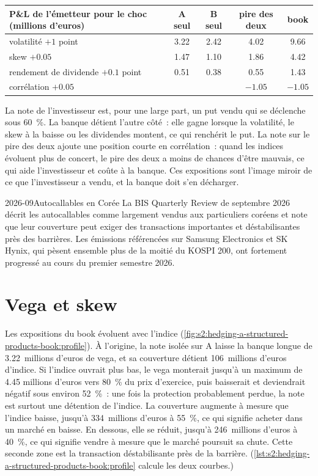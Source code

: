 \begin{center}
\small
\begin{tabular}{@{}lcccc@{}}
\toprule
P\&L de l'émetteur pour le choc (millions d'euros) & A seul & B seul & pire des deux & book\\
\midrule
volatilité $+1$ point & 3.22 & 2.42 & 4.02 & 9.66\\
skew $+0.05$ & 1.47 & 1.10 & 1.86 & 4.42\\
rendement de dividende $+0.1$ point & 0.51 & 0.38 & 0.55 & 1.43\\
corrélation $+0.05$ & & & $-1.05$ & $-1.05$\\
\bottomrule
\end{tabular}
\end{center}

La note de l'investisseur est, pour une large part, un put vendu qui se déclenche sous 60~\%. La banque détient l'autre côté~: elle gagne lorsque la volatilité, le skew à la baisse ou
les dividendes montent, ce qui renchérit le put. La note sur le pire des deux ajoute une position courte en corrélation~: quand les indices évoluent plus de concert, le pire
des deux a moins de chances d'être mauvais, ce qui aide l'investisseur et coûte à la banque. Ces expositions sont l'image miroir de ce que l'investisseur a vendu, et la
banque doit s'en décharger.

\begin{dated}{2026-09}{Autocallables en Corée}\label{dat:s2:hedging-a-structured-products-book:korea}
La BIS Quarterly Review de septembre 2026 décrit les autocallables comme largement vendus aux particuliers coréens et note que leur couverture peut exiger
des transactions importantes et déstabilisantes près des barrières. Les émissions référencées sur Samsung Electronics et SK Hynix, qui pèsent ensemble plus de la moitié du KOSPI 200, ont
fortement progressé au cours du premier semestre 2026.
\end{dated}

\section{Vega et skew}

Les expositions du book évoluent avec l'indice (\cref{fig:s2:hedging-a-structured-products-book:profile}). À l'origine, la note isolée sur A laisse la banque
longue de 3.22~millions d'euros de vega, et sa couverture détient 106~millions d'euros d'indice. Si l'indice ouvrait plus bas, le vega monterait jusqu'à un maximum de 4.45
millions d'euros vers 80~\% du prix d'exercice, puis baisserait et deviendrait négatif sous environ 52~\%~: une fois la protection probablement perdue, la note est surtout une détention de
l'indice. La couverture augmente à mesure que l'indice baisse, jusqu'à 334~millions d'euros à 55~\%, ce qui signifie acheter dans un marché en baisse. En dessous, elle se réduit, jusqu'à
246~millions d'euros à 40~\%, ce qui signifie vendre à mesure que le marché poursuit sa chute. Cette seconde zone est la transaction déstabilisante près de la barrière.
(\cref{lst:s2:hedging-a-structured-products-book:profile} calcule les deux courbes.)

